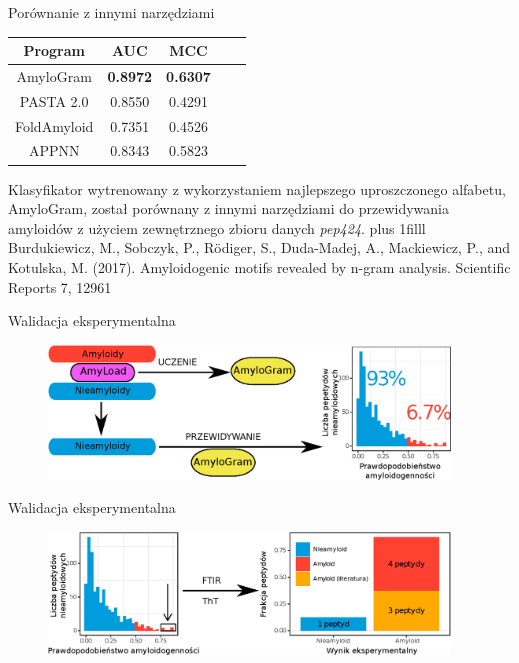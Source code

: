 \documentclass{beamer}\usepackage[]{graphicx}\usepackage[]{color}
\newcommand{\btVFill}{\vskip0pt plus 1filll}
\begin{document}
\begin{frame}{Porównanie z innymi narzędziami}

\begin{table}[ht]
\centering

\begin{tabular}{ccccc}
  \toprule
Program & AUC & MCC \\ 
  \midrule
AmyloGram & \textbf{0.8972} & \textbf{0.6307} \\ 
  \rowcolor{white}PASTA 2.0 \citep{walsh_pasta_2014} & 0.8550 & 0.4291  \\ 
   FoldAmyloid \citep{garbuzynskiy_foldamyloid:_2010} & 0.7351 & 0.4526  \\ 
  \rowcolor{white}APPNN \citep{familia_prediction_2015} & 0.8343 & 0.5823  \\ 
   \bottomrule
\end{tabular}
\end{table}

Klasyfikator wytrenowany z wykorzystaniem najlepszego uproszczonego alfabetu, AmyloGram, został porównany z innymi narzędziami do przewidywania amyloidów z użyciem zewnętrznego zbioru danych \textit{pep424}.
\btVFill
\tiny{Burdukiewicz, M., Sobczyk, P., Rödiger, S., Duda-Madej, A., Mackiewicz, P., and Kotulska, M. (2017). Amyloidogenic motifs revealed by n-gram analysis. Scientific Reports 7, 12961}


\end{frame}



\begin{frame}{Walidacja eksperymentalna}
\begin{figure} 
\includegraphics[width=0.95\textwidth]{static_figure/FalsePositives.eps}
\end{figure}
\end{frame}

\begin{frame}{Walidacja eksperymentalna}
\begin{figure} 
\includegraphics[width=0.95\textwidth]{static_figure/ExperimentalValidation.eps}
\end{figure}
\end{frame}
\end{document}
